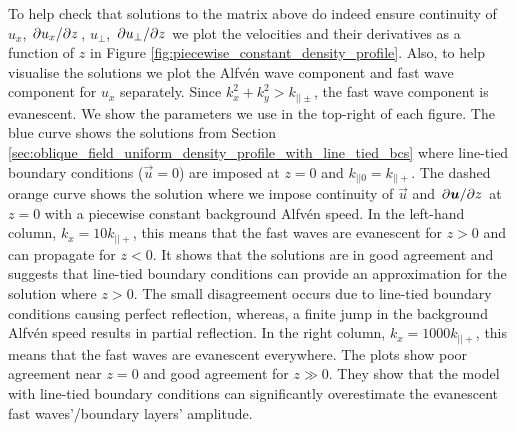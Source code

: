 To help check that solutions to the matrix above do indeed ensure continuity of $u_x$, $\pdv*{u_x}{z}$, $u_\perp$, $\pdv*{u_\perp}{z}$ we plot the velocities and their derivatives as a function of $z$ in Figure \ref{fig:piecewise_constant_density_profile}. Also, to help visualise the solutions we plot the Alfv\'en wave component and fast wave component for $u_x$ separately. Since $k_x^2+k_y^2>k_{||\pm}$, the fast wave component is evanescent.  We show the parameters we use in the top-right of each figure. The blue curve shows the solutions from Section \ref{sec:oblique_field_uniform_density_profile_with_line_tied_bcs} where line-tied boundary conditions ($\vec{u}=0$) are imposed at $z=0$ and $k_{||0}=k_{||+}$. The dashed orange curve shows the solution where we impose continuity of $\vec{u}$ and $\pdv*{\boldsymbol{u}}{z}$ at $z=0$ with a piecewise constant background Alfv\'en speed. In the left-hand column, $k_x=10k_{||+}$, this means that the fast waves are evanescent for $z>0$ and can propagate for $z<0$. It shows that the solutions are in good agreement and suggests that line-tied boundary conditions can provide an approximation for the solution where $z>0$. The small disagreement occurs due to line-tied boundary conditions causing perfect reflection, whereas, a finite jump in the background Alfv\'en speed results in partial reflection. In the right column, $k_x=1000k_{||+}$, this means that the fast waves are evanescent everywhere. The plots show poor agreement near $z=0$ and good agreement for $z\gg0$. They show that the model with line-tied boundary conditions can significantly overestimate the evanescent fast waves'/boundary layers' amplitude.

